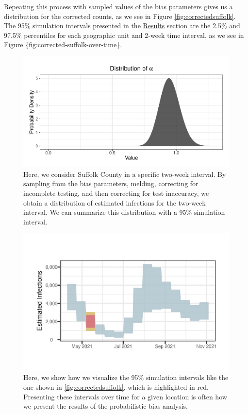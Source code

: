 \documentclass[12pt,twoside]{smiththesis}
\begin{document}
Repeating this process with sampled values of the bias parameters gives us a distribution for the corrected counts, as we see in Figure \ref{fig:correctedsuffolk}. The 95\% simulation intervals presented in the \protect\hyperlink{res}{Results} section are the 2.5\% and 97.5\% percentiles for each geographic unit and 2-week time interval, as we see in Figure \{fig:corrected-suffolk-over-time\}.
\begin{figure}
\includegraphics[width=1\linewidth]{thesis_files/figure-latex/unnamed-chunk-57-1} \caption{\label{fig:correctedsuffolk}Here, we consider Suffolk County in a specific two-week interval. By sampling from the bias parameters, melding, correcting for incomplete testing, and then correcting for test inaccuracy, we obtain a distribution of estimated infections for the two-week interval. We can summarize this distribution with a 95\% simulation interval.}\label{fig:unnamed-chunk-57}
\end{figure}
\begin{figure}
\includegraphics[width=1\linewidth]{../presentation/figure/suffolk_biweek_10} \caption{\label{fig:corrected-suffolk-over-time}Here, we show how we visualize the 95\% simulation intervals like the one shown in \ref{fig:correctedsuffolk}, which is highlighted in red. Presenting these intervals over time for a given location is often how we present the results of the probabilistic bias analysis.}\label{fig:unnamed-chunk-58}
\end{figure}
\end{document}
